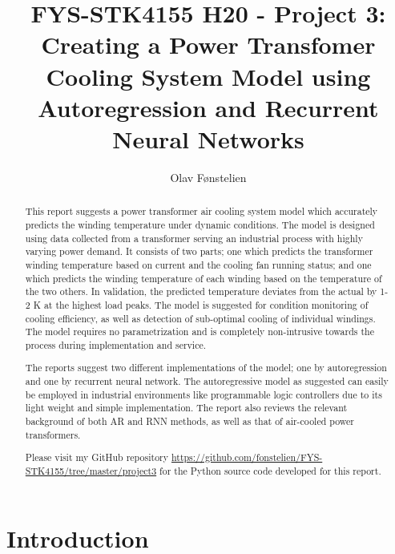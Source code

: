 \documentclass[]{article}
\title{FYS-STK4155 H20 - Project 3:\\Creating a Power Transfomer Cooling System Model using Autoregression and Recurrent Neural Networks}
\author{Olav Fønstelien}
\begin{document}
\maketitle

\begin{abstract}
This report suggests a power transformer air cooling system model which accurately predicts the winding temperature under dynamic conditions. The model is designed using data collected from a transformer serving an industrial process with highly varying power demand. It consists of two parts; one which predicts the transformer winding temperature based on current and the cooling fan running status; and one which predicts the winding temperature of each winding based on the temperature of the two others. In validation, the predicted temperature deviates from the actual by 1-2 K at the highest load peaks. The model is suggested for condition monitoring of cooling efficiency, as well as detection of sub-optimal cooling of individual windings. The model requires no parametrization and is completely non-intrusive towards the process during implementation and service.

The reports suggest two different implementations of the model; one by autoregression and one by recurrent neural network. The autoregressive model as suggested can easily be employed in industrial environments like programmable logic controllers due to its light weight and simple implementation. The report also reviews the relevant background of both AR and RNN methods, as well as that of air-cooled power transformers.

Please visit my GitHub repository \url{https://github.com/fonstelien/FYS-STK4155/tree/master/project3} for the Python source code developed for this report.
\end{abstract}

\section{Introduction} \label{sec:intro}
\end{document}
